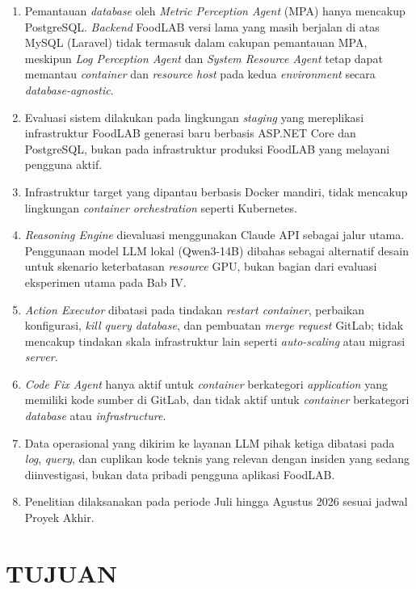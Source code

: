 \begin{enumerate}[label=\arabic*., leftmargin=*]
  \item Pemantauan \textit{database} oleh \textit{Metric Perception Agent} (MPA) hanya mencakup PostgreSQL. \textit{Backend} FoodLAB versi lama yang masih berjalan di atas MySQL (Laravel) tidak termasuk dalam cakupan pemantauan MPA, meskipun \textit{Log Perception Agent} dan \textit{System Resource Agent} tetap dapat memantau \textit{container} dan \textit{resource host} pada kedua \textit{environment} secara \textit{database-agnostic}.
  \item Evaluasi sistem dilakukan pada lingkungan \textit{staging} yang mereplikasi infrastruktur FoodLAB generasi baru berbasis ASP.NET Core dan PostgreSQL, bukan pada infrastruktur produksi FoodLAB yang melayani pengguna aktif.
  \item Infrastruktur target yang dipantau berbasis Docker mandiri, tidak mencakup lingkungan \textit{container orchestration} seperti Kubernetes.
  \item \textit{Reasoning Engine} dievaluasi menggunakan Claude API sebagai jalur utama. Penggunaan model LLM lokal (Qwen3-14B) dibahas sebagai alternatif desain untuk skenario keterbatasan \textit{resource} GPU, bukan bagian dari evaluasi eksperimen utama pada Bab IV.
  \item \textit{Action Executor} dibatasi pada tindakan \textit{restart container}, perbaikan konfigurasi, \textit{kill query database}, dan pembuatan \textit{merge request} GitLab; tidak mencakup tindakan skala infrastruktur lain seperti \textit{auto-scaling} atau migrasi \textit{server}.
  \item \textit{Code Fix Agent} hanya aktif untuk \textit{container} berkategori \textit{application} yang memiliki kode sumber di GitLab, dan tidak aktif untuk \textit{container} berkategori \textit{database} atau \textit{infrastructure}.
  \item Data operasional yang dikirim ke layanan LLM pihak ketiga dibatasi pada \textit{log}, \textit{query}, dan cuplikan kode teknis yang relevan dengan insiden yang sedang diinvestigasi, bukan data pribadi pengguna aplikasi FoodLAB.
  \item Penelitian dilaksanakan pada periode Juli hingga Agustus 2026 sesuai jadwal Proyek Akhir.
\end{enumerate}

\section{TUJUAN}

